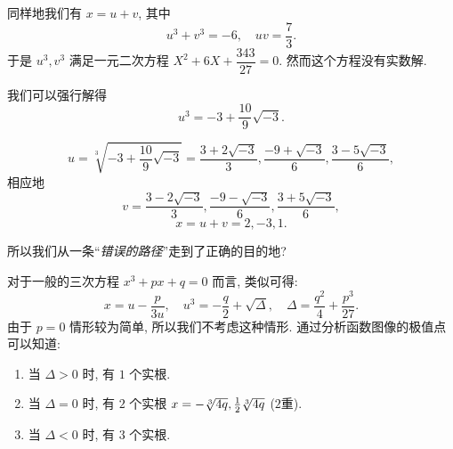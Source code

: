 \documentclass[xcolor={table}]{ctexbook}
\begin{document}
\begin{solution*}
同样地我们有 $x=u+v$, 其中
	\[u^3+v^3=-6,\quad uv=\frac73.\]
{于是 $u^3,v^3$ 满足一元二次方程 $X^2+6X+\dfrac{343}{27}=0$.
}{然而这个方程没有实数解.}

{我们可以强行解得
	\[u^3=-3+\frac{10}9\sqrt{-3}.\]}
\end{solution*}

\begin{solutionc}
	\[u=\sqrt[3]{-3+\frac{10}9\sqrt{-3}}
	=\frac{3+2\sqrt{-3}}3,\frac{-9+\sqrt{-3}}6,\frac{3-5\sqrt{-3}}6,\]
{相应地
	\[v=\frac{3-2\sqrt{-3}}3,\frac{-9-\sqrt{-3}}6,\frac{3+5\sqrt{-3}}6,\]
}{
	\[x=u+v=2,-3,1.\]}
\end{solutionc}

{所以我们从一条``\emph{错误的路径}''走到了正确的目的地?}

对于一般的三次方程 $x^3+px+q=0$ 而言, 类似可得:
	\[x=u-\frac p{3u},\quad u^3=-\frac q2+\sqrt{\Delta},\quad \Delta=\frac{q^2}4+\frac{p^3}{27}.\]
由于 $p=0$ 情形较为简单, 所以我们不考虑这种情形.
通过分析函数图像的极值点可以知道:
\begin{enumerate}
	\item 当 $\Delta>0$ 时, 有 $1$ 个实根.
	\item 当 $\Delta=0$ 时, 有 $2$ 个实根 $x=-\sqrt[3]{4q},\frac{1}{2}\sqrt[3]{4q}$ ($2$重).
	\item 当 $\Delta<0$ 时, 有 $3$ 个实根.
\end{enumerate}
\begin{center}
\end{center}
\end{document}
